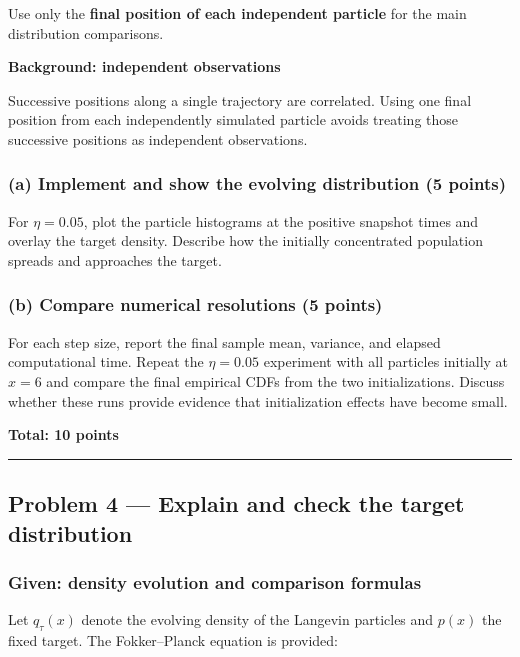 \documentclass[11pt,a4paper]{article}
\begin{document}
Use only the \textbf{final position of each independent particle} for
the main distribution comparisons.

\par\noindent\textbf{Background: independent observations}\par\nopagebreak[4]
Successive positions along a single trajectory are correlated. Using one
final position from each independently simulated particle avoids
treating those successive positions as independent observations.

\subsubsection{(a) Implement and show the evolving distribution (5
points)}\label{a-implement-and-show-the-evolving-distribution-5-points}

For \(\eta=0.05\), plot the particle histograms at the positive snapshot
times and overlay the target density. Describe how the initially
concentrated population spreads and approaches the target.

\subsubsection{(b) Compare numerical resolutions (5
points)}\label{b-compare-numerical-resolutions-5-points}

For each step size, report the final sample mean, variance, and elapsed
computational time. Repeat the \(\eta=0.05\) experiment with all
particles initially at \(x=6\) and compare the final empirical CDFs from
the two initializations. Discuss whether these runs provide evidence
that initialization effects have become small.

\noindent\textbf{Total: 10 points}

\bigskip\hrule\bigskip

\subsection{Problem 4 --- Explain and check the target
distribution}\label{problem-4-explain-and-check-the-target-distribution}

\subsubsection{Given: density evolution and comparison
formulas}\label{given-density-evolution-and-comparison-formulas}

Let \(q_\tau(x)\) denote the evolving density of the Langevin particles
and \(p(x)\) the fixed target. The Fokker--Planck equation is provided:
\end{document}
